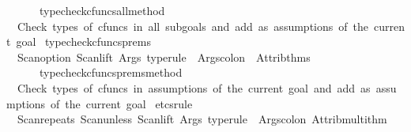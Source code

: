 \begin{isabellebody}
\ \ \ \ \ {\isachargreater}{\kern0pt}{\isachargreater}{\kern0pt}\ typecheck{\isacharunderscore}{\kern0pt}cfuncs{\isacharunderscore}{\kern0pt}all{\isacharunderscore}{\kern0pt}method{\isacartoucheclose}\isanewline
\ \ {\isachardoublequoteopen}Check\ types\ of\ cfuncs\ in\ all\ subgoals\ and\ add\ as\ assumptions\ of\ the\ current\ goal{\isachardoublequoteclose}\isanewline
\isanewline
{}\isamarkupfalse%
\ typecheck{\isacharunderscore}{\kern0pt}cfuncs{\isacharunderscore}{\kern0pt}prems\ {\isacharequal}{\kern0pt}\isanewline
\ \ {\isacartoucheopen}Scan{\isachardot}{\kern0pt}option\ {\isacharparenleft}{\kern0pt}{\isacharparenleft}{\kern0pt}Scan{\isachardot}{\kern0pt}lift\ {\isacharparenleft}{\kern0pt}Args{\isachardot}{\kern0pt}{\isachardollar}{\kern0pt}{\isachardollar}{\kern0pt}{\isachardollar}{\kern0pt}\ {\isachardoublequote}{\kern0pt}type{\isacharunderscore}{\kern0pt}rule{\isachardoublequote}{\kern0pt}\ {\isacharminus}{\kern0pt}{\isacharminus}{\kern0pt}\ Args{\isachardot}{\kern0pt}colon{\isacharparenright}{\kern0pt}{\isacharparenright}{\kern0pt}\ {\isacharbar}{\kern0pt}{\isacharminus}{\kern0pt}{\isacharminus}{\kern0pt}\ Attrib{\isachardot}{\kern0pt}thms{\isacharparenright}{\kern0pt}\isanewline
\ \ \ \ \ {\isachargreater}{\kern0pt}{\isachargreater}{\kern0pt}\ typecheck{\isacharunderscore}{\kern0pt}cfuncs{\isacharunderscore}{\kern0pt}prems{\isacharunderscore}{\kern0pt}method{\isacartoucheclose}\isanewline
\ \ {\isachardoublequoteopen}Check\ types\ of\ cfuncs\ in\ assumptions\ of\ the\ current\ goal\ and\ add\ as\ assumptions\ of\ the\ current\ goal{\isachardoublequoteclose}%
\endisatagML
{\isafoldML}%
%
\isadelimML
%
\endisadelimML
%
\isadelimdocument
%
\endisadelimdocument
%
\isatagdocument
%
\isamarkuptrue%
%
\endisatagdocument
{\isafolddocument}%
%
\isadelimdocument
%
\endisadelimdocument
%
\isadelimML
%
\endisadelimML
%
\isatagML
{}\isamarkupfalse%
\ etcs{\isacharunderscore}{\kern0pt}rule\ {\isacharequal}{\kern0pt}\ \isanewline
\ \ {\isacartoucheopen}Scan{\isachardot}{\kern0pt}repeats\ {\isacharparenleft}{\kern0pt}Scan{\isachardot}{\kern0pt}unless\ {\isacharparenleft}{\kern0pt}Scan{\isachardot}{\kern0pt}lift\ {\isacharparenleft}{\kern0pt}Args{\isachardot}{\kern0pt}{\isachardollar}{\kern0pt}{\isachardollar}{\kern0pt}{\isachardollar}{\kern0pt}\ {\isachardoublequote}{\kern0pt}type{\isacharunderscore}{\kern0pt}rule{\isachardoublequote}{\kern0pt}\ {\isacharminus}{\kern0pt}{\isacharminus}{\kern0pt}\ Args{\isachardot}{\kern0pt}colon{\isacharparenright}{\kern0pt}{\isacharparenright}{\kern0pt}\ Attrib{\isachardot}{\kern0pt}multi{\isacharunderscore}{\kern0pt}thm{\isacharparenright}{\kern0pt}\isanewline

\end{isabellebody}
